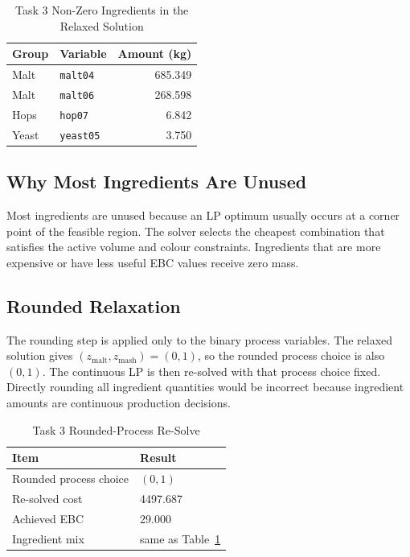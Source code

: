 \begin{table}[H]
\renewcommand{\arraystretch}{1.15}
\caption{Task 3 Non-Zero Ingredients in the Relaxed Solution}
\label{tab:task33-relaxation-ingredients}
\centering
\small
\begin{tabular}{@{}llr@{}}
\toprule
Group & Variable & Amount (kg) \\
\midrule
Malt & \texttt{malt04} & 685.349 \\
Malt & \texttt{malt06} & 268.598 \\
Hops & \texttt{hop07} & 6.842 \\
Yeast & \texttt{yeast05} & 3.750 \\
\bottomrule
\end{tabular}
\end{table}

\subsection{Why Most Ingredients Are Unused}
\label{sec:task3-unused}
Most ingredients are unused because an LP optimum usually occurs at a corner point of the feasible region. The solver selects the cheapest combination that satisfies the active volume and colour constraints. Ingredients that are more expensive or have less useful EBC values receive zero mass.

\subsection{Rounded Relaxation}
\label{sec:task3-rounded}
The rounding step is applied only to the binary process variables. The relaxed solution gives $(z_{\mathrm{malt}},z_{\mathrm{mash}})=(0,1)$, so the rounded process choice is also $(0,1)$. The continuous LP is then re-solved with that process choice fixed. Directly rounding all ingredient quantities would be incorrect because ingredient amounts are continuous production decisions.

\begin{table}[H]
\renewcommand{\arraystretch}{1.15}
\caption{Task 3 Rounded-Process Re-Solve}
\label{tab:task33-rounded}
\centering
\small
\begin{tabular}{@{}ll@{}}
\toprule
Item & Result \\
\midrule
Rounded process choice & $(0,1)$ \\
Re-solved cost & 4497.687 \\
Achieved EBC & 29.000 \\
Ingredient mix & same as Table~\ref{tab:task33-relaxation-ingredients} \\
\bottomrule
\end{tabular}
\end{table}

